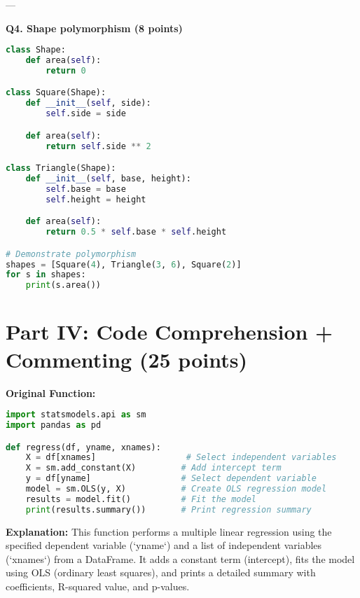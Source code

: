 \documentclass[12pt]{article}
\begin{document}
---

\textbf{Q4. Shape polymorphism (8 points)}
\begin{lstlisting}[language=Python]
class Shape:
    def area(self):
        return 0

class Square(Shape):
    def __init__(self, side):
        self.side = side

    def area(self):
        return self.side ** 2

class Triangle(Shape):
    def __init__(self, base, height):
        self.base = base
        self.height = height

    def area(self):
        return 0.5 * self.base * self.height

# Demonstrate polymorphism
shapes = [Square(4), Triangle(3, 6), Square(2)]
for s in shapes:
    print(s.area())
\end{lstlisting}

\newpage
\section*{Part IV: Code Comprehension + Commenting (25 points)}

\textbf{Original Function:}
\begin{lstlisting}[language=Python]
import statsmodels.api as sm
import pandas as pd

def regress(df, yname, xnames):
    X = df[xnames]                  # Select independent variables
    X = sm.add_constant(X)         # Add intercept term
    y = df[yname]                  # Select dependent variable
    model = sm.OLS(y, X)           # Create OLS regression model
    results = model.fit()          # Fit the model
    print(results.summary())       # Print regression summary
\end{lstlisting}

\textbf{Explanation:}  
This function performs a multiple linear regression using the specified dependent variable (`yname`) and a list of independent variables (`xnames`) from a DataFrame. It adds a constant term (intercept), fits the model using OLS (ordinary least squares), and prints a detailed summary with coefficients, R-squared value, and p-values.
\end{document}
